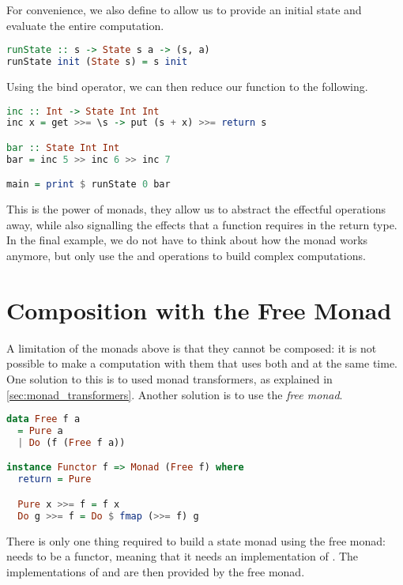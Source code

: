 For convenience, we also define  to allow us to provide an initial state and evaluate the entire computation.

\begin{lstlisting}[language=haskell,style=fancy]
runState :: s -> State s a -> (s, a)
runState init (State s) = s init
\end{lstlisting}

Using the bind operator, we can then reduce our  function to the following.

\begin{lstlisting}[language=haskell,style=fancy]
inc :: Int -> State Int Int
inc x = get >>= \s -> put (s + x) >>= return s

bar :: State Int Int
bar = inc 5 >> inc 6 >> inc 7

main = print $ runState 0 bar
\end{lstlisting}

This is the power of monads, they allow us to abstract the effectful operations away, while also signalling the effects that a function requires in the return type. In the final example, we do not have to think about how the  monad works anymore, but only use the  and  operations to build complex computations.

\section{Composition with the Free Monad}

A limitation of the monads above is that they cannot be composed: it is not possible to make a computation with them that uses both  and  at the same time. One solution to this is to used monad transformers, as explained in \cref{sec:monad_transformers}. Another solution is to use the \emph{free monad}.

\begin{lstlisting}[language=haskell,style=fancy]
data Free f a
  = Pure a
  | Do (f (Free f a))

instance Functor f => Monad (Free f) where
  return = Pure

  Pure x >>= f = f x
  Do g >>= f = Do $ fmap (>>= f) g
\end{lstlisting}

There is only one thing required to build a state monad using the free monad:  needs to be a functor, meaning that it needs an implementation of . The implementations of  and \hs{>>=} are then provided by the free monad.

